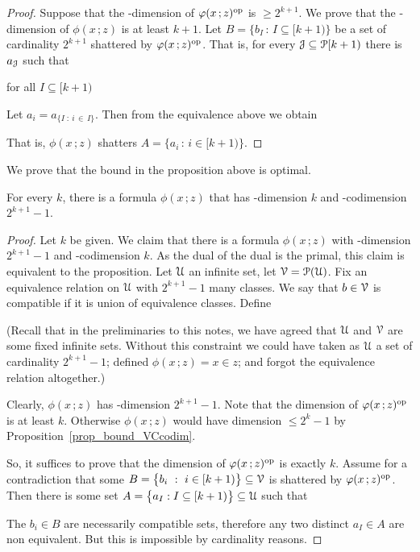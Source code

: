 \documentclass[scombinatorics.tex]{subfiles}
\begin{document}
\begin{proof}
  Suppose that the \vc-dimension of $\phi(x\,;z)^{\rm op}$ is $\ge 2^{k+1}$.
  We prove that the \vc-dimension of $\phi(x\,;z)$ is at least $k+1$.
  Let $B=\big\{b_I\,:\,I\subseteq [k+1)\big\}$ be a set of cardinality $2^{k+1}$ shattered by $\phi(x\,;z)^{\rm op}$. 
  That is, for every $\J\subseteq \P[k+1)$ there is $a_\J$ such that
  
  \hfill for all $I\subseteq [k+1)$
  
  Let $a_i=a_{\{I\; :\ i\,\in\, I\}}$. Then from the equivalence above we obtain
  
  
  That is, $\phi(x\,;z)$ shatters $A=\big\{a_i\,:\, i\in [k+1)\big\}$.
\end{proof}

We prove that the bound in the proposition above is optimal.

\begin{proposition}
  For every $k$, there is a formula $\phi(x\,;z)$ that has \vc-dimension $k$ and \vc-codimension $2^{k+1}-1$.
\end{proposition}
\begin{proof}
  Let $k$ be given.
  We claim that there is a formula $\phi(x\,;z)$ with \vc-dimension $2^{k+1}-1$ and \vc-codimension $k$.
  As the dual of the dual is the primal, this claim is equivalent to the proposition.
  Let $\U$ an infinite set, let $\V=\P(\U)$.
  Fix an equivalence relation on $\U$ with $2^{k+1}-1$ many classes.
  We say that $b\in\V$ is compatible if it is union of equivalence classes.
  Define
  
  
  (Recall that in the preliminaries to this notes, we have agreed that $\U$ and $\V$ are some fixed infinite sets. Without this constraint we could have taken as $\U$ a set of cardinality $2^{k+1}-1$; defined $\phi(x\,;z)=x\in z$; and forgot the equivalence relation altogether.)

  Clearly, $\phi(x\,;z)$ has \vc-dimension $2^{k+1}-1$.
  Note that the dimension of $\phi(x\,;z)^{\rm op}$ is at least $k$.
  Otherwise $\phi(x\,;z)$ would have dimension $\le2^k-1$ by Proposition~\ref{prop_bound_VCcodim}.
  
  So, it suffices to prove that the dimension of $\phi(x\,;z)^{\rm op}$ is exactly $k$.
  Assume for a contradiction that some $B=\big\{b_i\ :\ i\in[k+1)\big\}\subseteq\V$ is shattered by $\phi(x\,;z)^{\rm op}$.
  Then there is some set $A=\big\{a_I:I\subseteq[k+1)\big\}\subseteq\U$ such that
  

  The $b_i\in B$ are necessarily compatible sets, therefore any two distinct $a_I\in A$ are non equivalent.
  But this is impossible by cardinality reasons.
\end{proof}
\end{document}
